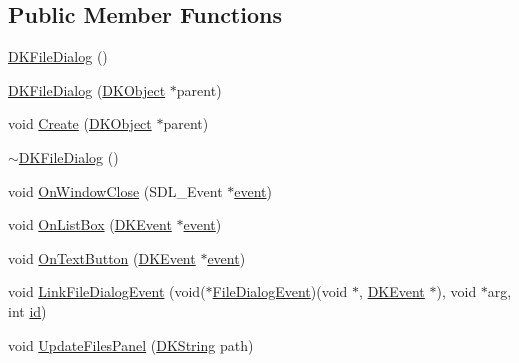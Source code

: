 \subsection*{Public Member Functions}
\begin{DoxyCompactItemize}
\item 
\hyperlink{class_d_k_file_dialog_ab93796c73c2f217c24e8b781aa9271e7}{D\-K\-File\-Dialog} ()
\item 
\hyperlink{class_d_k_file_dialog_ad42b4e58e53b1bb14146a428a979367f}{D\-K\-File\-Dialog} (\hyperlink{class_d_k_object}{D\-K\-Object} $\ast$parent)
\item 
void \hyperlink{class_d_k_file_dialog_a5251d3e811238a2a93f63c4929c42ced}{Create} (\hyperlink{class_d_k_object}{D\-K\-Object} $\ast$parent)
\item 
\hyperlink{class_d_k_file_dialog_a938fef792db617cc6962082b77aa65dd}{$\sim$\-D\-K\-File\-Dialog} ()
\item 
void \hyperlink{class_d_k_file_dialog_a7816e7b2b4f39e5be944788b369a6549}{On\-Window\-Close} (S\-D\-L\-\_\-\-Event $\ast$\hyperlink{class_d_k_event_a3deebb932ed734363c4ece87971bc45f}{event})
\item 
void \hyperlink{class_d_k_file_dialog_a184a2ca236cb75179066dd6d674bfcaf}{On\-List\-Box} (\hyperlink{class_d_k_event}{D\-K\-Event} $\ast$\hyperlink{class_d_k_event_a3deebb932ed734363c4ece87971bc45f}{event})
\item 
void \hyperlink{class_d_k_file_dialog_a7aca5321ad7f1ab61b6a9c79d578781f}{On\-Text\-Button} (\hyperlink{class_d_k_event}{D\-K\-Event} $\ast$\hyperlink{class_d_k_event_a3deebb932ed734363c4ece87971bc45f}{event})
\item 
void \hyperlink{class_d_k_file_dialog_a6ff258933cd23adad22adb9347f5a77c}{Link\-File\-Dialog\-Event} (void($\ast$\hyperlink{class_d_k_event_a15e926f6b44f003c75930d4f2b5fb988}{File\-Dialog\-Event})(void $\ast$, \hyperlink{class_d_k_event}{D\-K\-Event} $\ast$), void $\ast$arg, int \hyperlink{class_d_k_event_a46877918e12fcb3b2c8988379b6fa6fa}{id})
\item 
void \hyperlink{class_d_k_file_dialog_aa3c81773b8c333de616b54c2f04a3089}{Update\-Files\-Panel} (\hyperlink{_d_k_string_8h_ac168e8555ceba18e1a2919b21976bc84}{D\-K\-String} path)
\end{DoxyCompactItemize}
